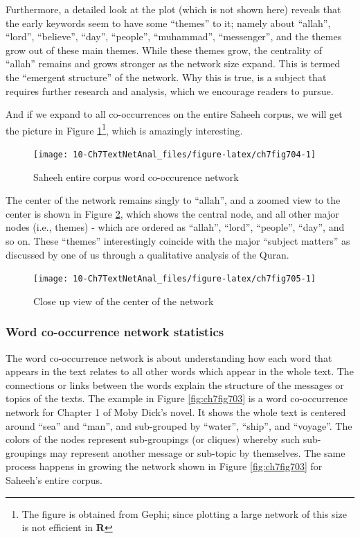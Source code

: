 \documentclass[
]{article}
\begin{document}
Furthermore, a detailed look at the plot (which is not shown here) reveals that the early keywords seem to have some ``themes'' to it; namely about ``allah'', ``lord'', ``believe'', ``day'', ``people'', ``muhammad'', ``messenger'', and the themes grow out of these main themes. While these themes grow, the centrality of ``allah'' remains and grows stronger as the network size expand. This is termed the ``emergent structure'' of the network. Why this is true, is a subject that requires further research and analysis, which we encourage readers to pursue.

And if we expand to all co-occurrences on the entire Saheeh corpus, we will get the picture in Figure \ref{fig:ch7fig704}\footnote{The figure is obtained from Gephi; since plotting a large network of this size is not efficient in \textbf{R}}, which is amazingly interesting.

\begin{figure}

{\centering \texttt{[image: 10-Ch7TextNetAnal\_files/figure-latex/ch7fig704-1]} 

}

\caption{Saheeh entire corpus word co-occurence network}\label{fig:ch7fig704}
\end{figure}

The center of the network remains singly to ``allah'', and a zoomed view to the center is shown in Figure \ref{fig:ch7fig705}, which shows the central node, and all other major nodes (i.e., themes) - which are ordered as ``allah'', ``lord'', ``people'', ``day'', and so on. These ``themes'' interestingly coincide with the major ``subject matters'' as discussed by one of us through a qualitative analysis of the Quran.

\begin{figure}

{\centering \texttt{[image: 10-Ch7TextNetAnal\_files/figure-latex/ch7fig705-1]} 

}

\caption{Close up view of the center of the network}\label{fig:ch7fig705}
\end{figure}

\hypertarget{word-co-occurrence-network-statistics}{%
\subsubsection{Word co-occurrence network statistics}\label{word-co-occurrence-network-statistics}}

The word co-occurrence network is about understanding how each word that appears in the text relates to all other words which appear in the whole text. The connections or links between the words explain the structure of the messages or topics of the texts. The example in Figure \ref{fig:ch7fig703} is a word co-occurrence network for Chapter 1 of Moby Dick's novel. It shows the whole text is centered around ``sea'' and ``man'', and sub-grouped by ``water'', ``ship'', and ``voyage''. The colors of the nodes represent sub-groupings (or cliques) whereby such sub-groupings may represent another message or sub-topic by themselves. The same process happens in growing the network shown in Figure \ref{fig:ch7fig703} for Saheeh's entire corpus.
\end{document}
